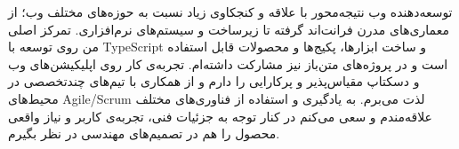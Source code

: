 

\begin{cvparagraph}
توسعه‌دهنده وب نتیجه‌محور با علاقه و کنجکاوی زیاد نسبت به حوزه‌های مختلف وب؛ از معماری‌های مدرن فرانت‌اند گرفته تا زیرساخت و سیستم‌های نرم‌افزاری.
تمرکز اصلی من روی توسعه با TypeScript و ساخت ابزارها، پکیج‌ها و محصولات قابل استفاده است و در پروژه‌های متن‌باز نیز مشارکت داشته‌ام. تجربه‌ی کار روی اپلیکیشن‌های وب و دسکتاپ مقیاس‌پذیر و پرکارایی را دارم و از همکاری با تیم‌های چندتخصصی در محیط‌های Agile/Scrum لذت می‌برم. به یادگیری و استفاده از فناوری‌های مختلف علاقه‌مندم و سعی می‌کنم در کنار توجه به جزئیات فنی، تجربه‌ی کاربر و نیاز واقعی محصول را هم در تصمیم‌های مهندسی در نظر بگیرم.

\end{cvparagraph}
